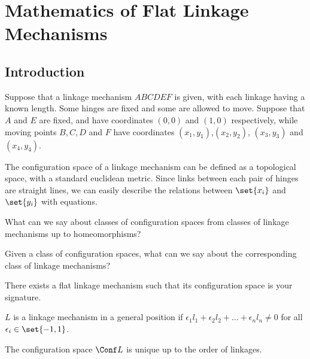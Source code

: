 \documentclass[11pt]{scrartcl}
\begin{document}
  \section{Mathematics of Flat Linkage Mechanisms}

  \subsection{Introduction}

  Suppose that a linkage mechanism $ABCDEF$ is given, with each
  linkage having a known length. Some hinges are fixed and some are
  allowed to move. Suppose that $A$ and $E$ are fixed, and have
  coordinates $(0, 0)$ and $(1, 0)$ respectively, while moving points
  $B, C, D$ and $F$ have coordinates $(x_{1},
  y_{1})$,$(x_{2}, y_{2})$, $(x_{3}, y_{3})$ and $(x_{4}, y_{4})$.
  
  The configuration space of a linkage mechanism can be defined as a
  topological space, with a standard euclidean metric. Since links
  between each pair of hinges are straight lines, we can easily
  describe the relations between $\set{x_{i}}$ and $\set{y_{i}}$ with equations.

  \begin{problem*}
    \hfill
    
    What can we say about classes of configuration spaces from classes
    of linkage mechanisms up to homeomorphisms?
  \end{problem*}

  \begin{problem*}
    \hfill

    Given a class of configuration spaces, what can we say about the
    corresponding class of linkage mechanisms?

  \end{problem*}

  \begin{theorem}[Thurston]
    There exists a flat linkage mechanism such that its configuration
    space is your signature.
  \end{theorem}
  \begin{definition}
    $L$ is a linkage mechanism in a general position if
    $\epsilon_{1}l_{1}+\epsilon_{2}l_{2}+\dots + \epsilon_{n}l_{n}
    \neq 0$ for all $\epsilon_{i} \in \set{-1, 1}$.
  \end{definition}

  \begin{exercise}

    The configuration space $\Conf L$ is unique up to the order of
    linkages.

  \end{exercise}
\end{document}
